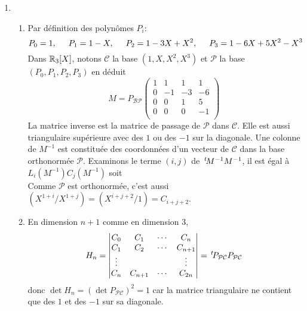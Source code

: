 \begin{enumerate}
  \item
\begin{enumerate}
  \item Par définition des polynômes $P_i$:
\begin{displaymath}
P_0 = 1,\hspace{0.5cm} P_1 = 1-X,\hspace{0.5cm} P_2 = 1-3X+X^2,\hspace{0.5cm} P_3 = 1-6X+5X^2-X^3   
\end{displaymath}
Dans $\mathbb{R}_3[X]$, notons $\mathcal C$ la base $(1,X,X^2,X^3)$ et $\mathcal{P}$ la base $(P_0,P_1,P_2,P_3)$ en déduit 
\begin{displaymath}
M= P_{\mathcal{B} \mathcal{P}}
\begin{pmatrix}
1 & 1  & 1  & 1  \\
0 & -1 & -3 & -6 \\
0 &  0 & 1  & 5  \\
0 &  0 & 0  & -1 \\
\end{pmatrix}
\end{displaymath}
La matrice inverse est la matrice de passage de $\mathcal{P}$ dans $\mathcal{C}$. Elle est aussi triangulaire supérieure avec des $1$ ou des $-1$ sur la diagonale.\newline
Une colonne de $M^{-1}$ est constituée des coordonnées d'un vecteur de $\mathcal{C}$ dans la base orthonormée $\mathcal{P}$. Examinons le terme $(i,j)$ de $\,\mathstrut^t\! M^{-1} M^{-1}$, il est égal à $L_i(M^{-1})C_j(M^{-1})$ soit 
\begin{displaymath}
 [\text{ ligne des coord de } X^{1+i}\text{ dans }\mathcal{P}] [\text{ colonne des coord de } X^{1+j}\text{ dans }\mathcal{P}]  
\end{displaymath}
Comme $\mathcal{P}$ est orthonormée, c'est aussi $(X^{1+i}/X^{1+j})=(X^{i+j+2}/1)=C_{i+j+2}$.
  \item En dimension $n+1$ comme en dimension $3$, 
\begin{displaymath}
H_n=
\begin{vmatrix}
C_0    & C_1     & \cdots & C_n     \\
C_1    & C_2     & \cdots & C_{n+1} \\
\vdots &         &        & \vdots  \\
C_{n}  & C_{n+1} & \cdots & C_{2n}
\end{vmatrix}
= \,\mathstrut^t\! P_{\mathcal{P}\mathcal{C}} P_{\mathcal{P}\mathcal{C}}
\end{displaymath}
donc $\det H_n = (\det P_{\mathcal{P}\mathcal{C}})^2 = 1$ car la matrice triangulaire ne contient que des $1$ et des $-1$ sur sa diagonale.
\end{enumerate}

\end{enumerate}
